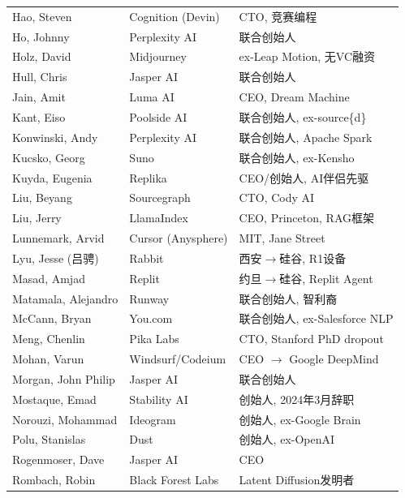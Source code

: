 \begin{keybox}
\begin{tabularx}{\textwidth}{l l X}
Hao, Steven           & Cognition (Devin)    & CTO, 竞赛编程 \\
Ho, Johnny            & Perplexity AI        & 联合创始人 \\
Holz, David           & Midjourney           & ex-Leap Motion, 无VC融资 \\
Hull, Chris           & Jasper AI            & 联合创始人 \\
Jain, Amit            & Luma AI              & CEO, Dream Machine \\
Kant, Eiso            & Poolside AI          & 联合创始人, ex-source\{d\} \\
Konwinski, Andy       & Perplexity AI        & 联合创始人, Apache Spark \\
Kucsko, Georg         & Suno                 & 联合创始人, ex-Kensho \\
Kuyda, Eugenia        & Replika              & CEO/创始人, AI伴侣先驱 \\
Liu, Beyang           & Sourcegraph          & CTO, Cody AI \\
Liu, Jerry            & LlamaIndex           & CEO, Princeton, RAG框架 \\
Lunnemark, Arvid      & Cursor (Anysphere)   & MIT, Jane Street \\
Lyu, Jesse (吕骋)     & Rabbit               & 西安$\to$硅谷, R1设备 \\
Masad, Amjad          & Replit               & 约旦$\to$硅谷, Replit Agent \\
Matamala, Alejandro   & Runway               & 联合创始人, 智利裔 \\
McCann, Bryan         & You.com              & 联合创始人, ex-Salesforce NLP \\
Meng, Chenlin         & Pika Labs            & CTO, Stanford PhD dropout \\
Mohan, Varun          & Windsurf/Codeium     & CEO $\to$ Google DeepMind \\
Morgan, John Philip   & Jasper AI            & 联合创始人 \\
Mostaque, Emad        & Stability AI         & 创始人, 2024年3月辞职 \\
Norouzi, Mohammad     & Ideogram             & 创始人, ex-Google Brain \\
Polu, Stanislas       & Dust                 & 创始人, ex-OpenAI \\
Rogenmoser, Dave      & Jasper AI            & CEO \\
Rombach, Robin        & Black Forest Labs    & Latent Diffusion发明者 \\

\end{tabularx}
\end{keybox}
